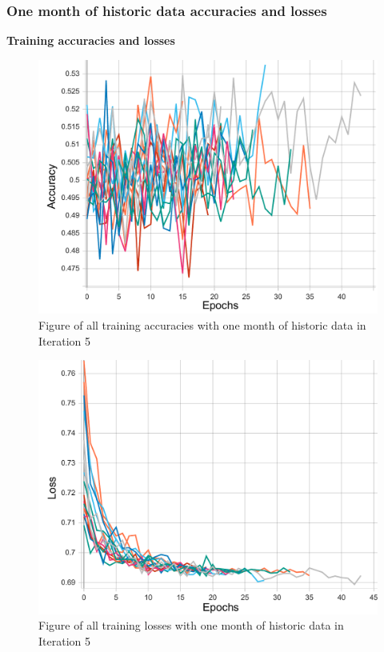 \subsubsection{One month of historic data accuracies and losses}
\textbf{Training accuracies and losses}
\begin{figure}[ht]
    \centering
    \includegraphics[width=0.575\columnwidth]{figures/results/final/month_acc_t.pdf}
    \caption[Training accuracies for Iteration 5 with one month of historic data]{Figure of all training accuracies with one month of historic data in Iteration 5}
    \label{fig:iteration5_month_train_accuracy}
\end{figure}
\FloatBarrier

\begin{figure}[ht]
    \centering
    \includegraphics[width=0.575\columnwidth]{figures/results/final/month_loss_t.pdf}
    \caption[Training losses for Iteration 5 with one month of historic data]{Figure of all training losses with one month of historic data in Iteration 5}
    \label{fig:iteration5_month_train_loss}
\end{figure}
\FloatBarrier

